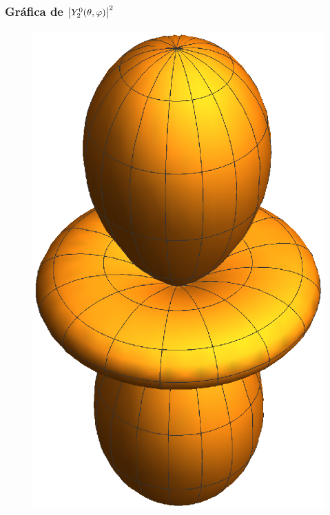 \documentclass[12pt]{beamer}
\begin{document}
\begin{frame}
\frametitle{Gráfica de $\abs{Y_{2}^{0} (\theta, \varphi)}^{2}$}
\begin{figure}
    \centering
    \includegraphics[scale=0.5]{Imagenes/AE2_20.eps}
\end{figure}
\end{frame}
\end{document}
